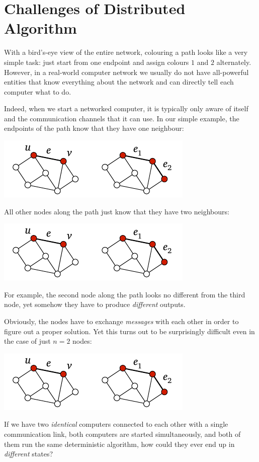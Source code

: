 \section{Challenges of Distributed Algorithm}

With a bird's-eye view of the entire network, colouring a path looks like a very simple task: just start from one endpoint and assign colours $1$ and $2$ alternately. However, in a real-world computer network we usually do not have all-powerful entities that know everything about the network and can directly tell each computer what to do.

Indeed, when we start a networked computer, it is typically only aware of itself and the communication channels that it can use. In our simple example, the endpoints of the path know that they have one neighbour:
\begin{center}
    \includegraphics[page=\PIntroDegOne]{figs.pdf}
\end{center}
All other nodes along the path just know that they have two neighbours:
\begin{center}
    \includegraphics[page=\PIntroDegTwo]{figs.pdf}
\end{center}
For example, the second node along the path looks no different from the third node, yet somehow they have to produce \emph{different} outputs.

Obviously, the nodes have to exchange \emph{messages} with each other in order to figure out a proper solution. Yet this turns out to be surprisingly difficult even in the case of just $n = 2$ nodes:
\begin{center}
    \includegraphics[page=\PIntroTwo]{figs.pdf}
\end{center}
If we have two \emph{identical} computers connected to each other with a single communication link, both computers are started simultaneously, and both of them run the same deterministic algorithm, how could they ever end up in \emph{different} states?

